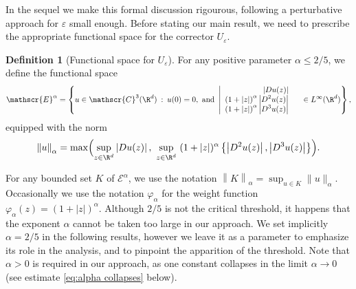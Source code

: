 \documentclass[10pt]{amsart}
\let\mathcal\mathscr
\newcommand{\cC}{\mathcal{C}}
\theoremstyle{plain}
\theoremstyle{definition}
\newtheorem{definition}[thm]{Definition}
\let\eps\varepsilon
\let\ds\displaystyle
\newcommand{\abs}[1]{\left\lvert#1\right\rvert}
\newcommand{\nalph}[1]{\left\lVert#1\right\rVert_\alpha}
\newcommand{\Ea}{\mathcal{E}^\alpha}
\newcommand{\vphia}{\varphi_\alpha}
\begin{document}
In the sequel we make this formal discussion rigourous, following a perturbative approach for $\eps$ small enough. Before stating our main result, we need to prescribe the appropriate functional space for the corrector $U_\eps$.

\begin{definition}[Functional space for $U_\eps$]\label{def:Ea}
For any positive parameter 	$\alpha \leq 2/5$, we define the functional space \begin{equation*}
\Ea =\left\{
u \in \cC^3(\R^d)\::\: u(0)=0, \text{ and } \left|
\begin{array}{rr} \ds \abs{ D u(z)} & \\
\ds \left(1+|z| \right) ^\alpha \abs{ D^2 u(z) }& \\
\ds \left(1+|z| \right) ^\alpha \abs{ D^3 u(z) }& \\
\end{array} \right. \in L^\infty(\R^d)
\right\},
\end{equation*}
equipped with the norm
\begin{equation}\label{eq:normalpha}
\nalph{u} = \max \Bigl(\sup_{z \in \R^d} \abs{D u(z) }, \ \sup_{z \in \R^d} \ (1+\abs{z})^\alpha \left\{\abs{ D^2 u(z) }, \abs{ D^3 u(z) } \right\} \Bigr).
\end{equation}
\end{definition}
For any bounded set $K$ of $\Ea$, we use the notation $\nalph{K} = \sup_{u\in K} \|u\|_\alpha$. Occasionally we use the notation $\vphia$ for the weight function $\vphia(z) = (1+\abs{z})^\alpha$. Although $2/5$ is not the critical threshold, it happens that the exponent $\alpha$ cannot be taken too large in our approach. We set implicitly $\alpha = 2/5$ in the following results, however we leave it as a parameter to emphasize its role in the analysis, and to pinpoint the apparition of the threshold. Note that $\alpha>0$ is required in our approach, as one constant collapses in the limit $\alpha\to 0$ (see estimate \eqref{eq:alpha collapses} below).
\end{document}
